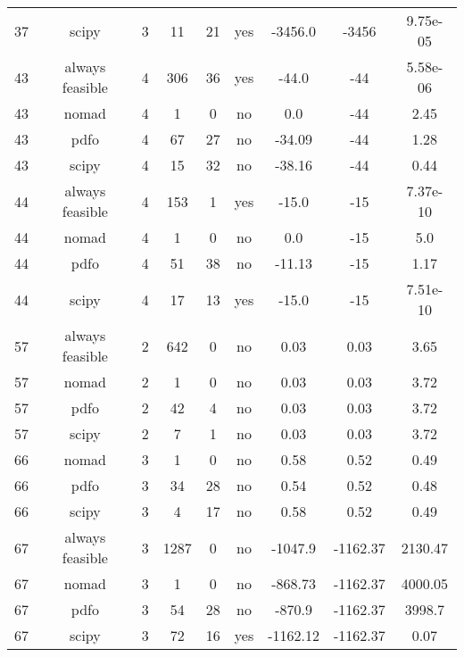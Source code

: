 \begin{scriptsize}
\begin{center}
\begin{longtable}{ccccccccc}
 37 &           scipy &  3 &     11 &     21 &     yes &     -3456.0 &       -3456 & 9.75e-05\\
 43 & always feasible &  4 &    306 &     36 &     yes &       -44.0 &         -44 & 5.58e-06\\
 43 &           nomad &  4 &      1 &      0 &      no &         0.0 &         -44 &     2.45\\
 43 &            pdfo &  4 &     67 &     27 &      no &      -34.09 &         -44 &     1.28\\
 43 &           scipy &  4 &     15 &     32 &      no &      -38.16 &         -44 &     0.44\\
 44 & always feasible &  4 &    153 &      1 &     yes &       -15.0 &         -15 & 7.37e-10\\
 44 &           nomad &  4 &      1 &      0 &      no &         0.0 &         -15 &      5.0\\
 44 &            pdfo &  4 &     51 &     38 &      no &      -11.13 &         -15 &     1.17\\
 44 &           scipy &  4 &     17 &     13 &     yes &       -15.0 &         -15 & 7.51e-10\\
 57 & always feasible &  2 &    642 &      0 &      no &        0.03 &        0.03 &     3.65\\
 57 &           nomad &  2 &      1 &      0 &      no &        0.03 &        0.03 &     3.72\\
 57 &            pdfo &  2 &     42 &      4 &      no &        0.03 &        0.03 &     3.72\\
 57 &           scipy &  2 &      7 &      1 &      no &        0.03 &        0.03 &     3.72\\
 66 &           nomad &  3 &      1 &      0 &      no &        0.58 &        0.52 &     0.49\\
 66 &            pdfo &  3 &     34 &     28 &      no &        0.54 &        0.52 &     0.48\\
 66 &           scipy &  3 &      4 &     17 &      no &        0.58 &        0.52 &     0.49\\
 67 & always feasible &  3 &   1287 &      0 &      no &     -1047.9 &    -1162.37 &  2130.47\\
 67 &           nomad &  3 &      1 &      0 &      no &     -868.73 &    -1162.37 &  4000.05\\
 67 &            pdfo &  3 &     54 &     28 &      no &      -870.9 &    -1162.37 &   3998.7\\
 67 &           scipy &  3 &     72 &     16 &     yes &    -1162.12 &    -1162.37 &     0.07\\

\end{longtable}
\end{center}
\end{scriptsize}
